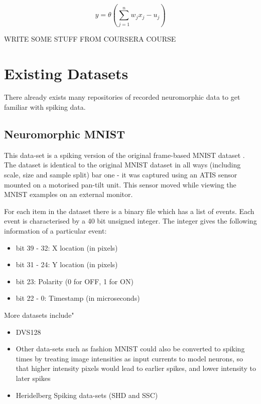 $$ y = \theta(\sum^n_{j=1}w_jx_j-u_j) $$

\color{red} WRITE SOME STUFF FROM COURSERA COURSE\cite{RaoCoursera} \color{black}

\section{Existing Datasets}

There already exists many repositories of recorded neuromorphic data to get familiar with spiking data.

\subsection{Neuromorphic MNIST}

This data-set is a spiking version of the original frame-based MNIST dataset \cite{NMNIST}. The dataset is identical to the original MNIST dataset in all ways (including scale, size and sample split) bar one - it was captured using an ATIS sensor mounted on a motorised pan-tilt unit. This sensor moved while viewing the MNIST examples on an external monitor.

For each item in the dataset there is a binary file which has a list of events. Each event is characterised by a 40 bit unsigned integer. The integer gives the following information of a particular event:

\begin{itemize}
      \item bit 39 - 32: X location (in pixels)
      \item bit 31 - 24: Y location (in pixels)
      \item bit 23: Polarity (0 for OFF, 1 for ON)
      \item bit 22 - 0: Timestamp (in microseconds)
\end{itemize}

More datasets include"

\begin{itemize}
      \item DVS128
      \item Other data-sets such as fashion MNIST could also be converted to spiking times by treating image intensities as input currents to model neurons, so that higher intensity pixels would lead to earlier spikes, and lower intensity to later spikes
      \item Heridelberg Spiking data-sets (SHD and SSC)
\end{itemize}

